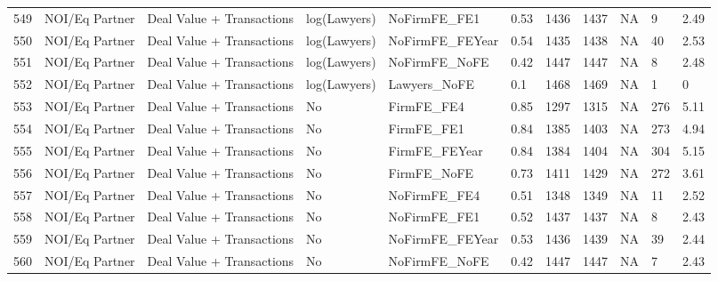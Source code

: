 \documentclass{article}
\begin{document}
\begin{table}[H]
\begin{tabular}{rllllllllll}
  549 & NOI/Eq Partner & Deal Value + Transactions & log(Lawyers) & NoFirmFE\_FE1 & 0.53 & 1436 & 1437 & NA & 9 & 2.49 \\ 
  550 & NOI/Eq Partner & Deal Value + Transactions & log(Lawyers) & NoFirmFE\_FEYear & 0.54 & 1435 & 1438 & NA & 40 & 2.53 \\ 
  551 & NOI/Eq Partner & Deal Value + Transactions & log(Lawyers) & NoFirmFE\_NoFE & 0.42 & 1447 & 1447 & NA & 8 & 2.48 \\ 
  552 & NOI/Eq Partner & Deal Value + Transactions & log(Lawyers) & Lawyers\_NoFE & 0.1 & 1468 & 1469 & NA & 1 & 0 \\ 
  553 & NOI/Eq Partner & Deal Value + Transactions & No & FirmFE\_FE4 & 0.85 & 1297 & 1315 & NA & 276 & 5.11 \\ 
  554 & NOI/Eq Partner & Deal Value + Transactions & No & FirmFE\_FE1 & 0.84 & 1385 & 1403 & NA & 273 & 4.94 \\ 
  555 & NOI/Eq Partner & Deal Value + Transactions & No & FirmFE\_FEYear & 0.84 & 1384 & 1404 & NA & 304 & 5.15 \\ 
  556 & NOI/Eq Partner & Deal Value + Transactions & No & FirmFE\_NoFE & 0.73 & 1411 & 1429 & NA & 272 & 3.61 \\ 
  557 & NOI/Eq Partner & Deal Value + Transactions & No & NoFirmFE\_FE4 & 0.51 & 1348 & 1349 & NA & 11 & 2.52 \\ 
  558 & NOI/Eq Partner & Deal Value + Transactions & No & NoFirmFE\_FE1 & 0.52 & 1437 & 1437 & NA & 8 & 2.43 \\ 
  559 & NOI/Eq Partner & Deal Value + Transactions & No & NoFirmFE\_FEYear & 0.53 & 1436 & 1439 & NA & 39 & 2.44 \\ 
  560 & NOI/Eq Partner & Deal Value + Transactions & No & NoFirmFE\_NoFE & 0.42 & 1447 & 1447 & NA & 7 & 2.43 \\ 
   \hline
\end{tabular}
\end{table}
\end{document}
